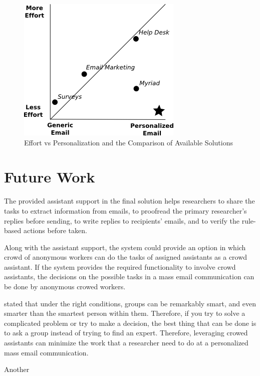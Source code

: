 \begin{figure}[htbp]
	\centering
	\includegraphics[width=.55\textwidth]{imgs/drawingEfforPersonalizationAnnotations.png}
	\caption[Effort vs Personalization and the Comparison of Available Solutions]{Effort vs Personalization and the Comparison of Available Solutions}
	\label{fig:drawingEfforPersonalizationAnnotations}
\end{figure}

\section{Future Work}
\label{sec:6.2:FutuWork}

The provided assistant support in the final solution helps researchers to share the tasks to extract information from emails, to proofread the primary researcher's replies before sending, to write replies to recipients' emails, and to verify the rule-based actions before taken.
\vspace{1cm}

Along with the assistant support, the system could provide an option in which crowd of anonymous workers can do the tasks of assigned assistants as a crowd assistant. If the system provides the required functionality to involve crowd assistants, the decisions on the possible tasks in a mass email communication can be done by anonymous crowed workers.
\vspace{1cm}

\cite{Surowiecki2005} stated that under the right conditions, groups can be remarkably smart, and even smarter than the smartest person within them. Therefore, if you try to solve a complicated problem or try to make a decision, the best thing that can be done
is to ask a group instead of trying to find an expert. Therefore, leveraging crowed assistants can minimize the work that a researcher need to do at a personalized mass email communication.

Another 


 